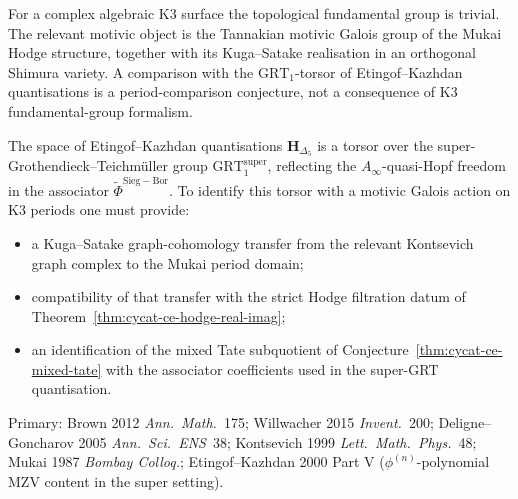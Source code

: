 \begin{remark}
\label{rem:cycat-ce-motivic-fundamental-group}
For a complex algebraic K3 surface the topological fundamental group is
trivial. The relevant motivic object is the Tannakian
motivic Galois group of the Mukai Hodge structure, together with its
Kuga--Satake realisation in an orthogonal Shimura variety. A comparison
with the $\mathrm{GRT}_1$-torsor of Etingof--Kazhdan quantisations is a
period-comparison conjecture, not a consequence of K3 fundamental-group
formalism.

The space of Etingof--Kazhdan quantisations $\mathbf{H}_{\Delta_5}$ is a
torsor over the super-Grothendieck--Teichm\"uller group
$\mathrm{GRT}_1^{\mathrm{super}}$, reflecting the $A_\infty$-quasi-Hopf
freedom in the associator $\widetilde\Phi^{\mathrm{Sieg-Bor}}$. To
identify this torsor with a motivic Galois action on K3 periods one must
provide:
\begin{itemize}
 \item a Kuga--Satake graph-cohomology transfer from the relevant
 Kontsevich graph complex to the Mukai period domain;
 \item compatibility of that transfer with the strict Hodge filtration
 datum of Theorem~\textup{\ref{thm:cycat-ce-hodge-real-imag}};
 \item an identification of the mixed Tate subquotient of
 Conjecture~\textup{\ref{thm:cycat-ce-mixed-tate}} with the
 associator coefficients used in the super-GRT quantisation.
\end{itemize}
Primary: Brown 2012 \emph{Ann.\ Math.}~175; Willwacher 2015
\emph{Invent.}~200; Deligne--Goncharov 2005 \emph{Ann.\ Sci.\ ENS}~38;
Kontsevich 1999 \emph{Lett.\ Math.\ Phys.}~48; Mukai 1987
\emph{Bombay Colloq.}; Etingof--Kazhdan 2000 Part V
($\phi^{(n)}$-polynomial MZV content in the super setting).
\end{remark}
